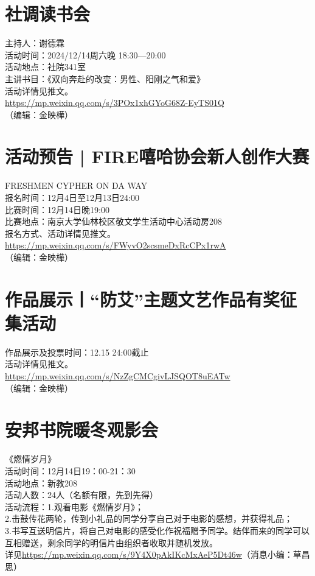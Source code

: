 \documentclass[letterpaper, 12pt]{article}
\begin{document}
\begin{multicols}{2}
\section{社调读书会}
主持人：谢德霖\\
活动时间：2024/12/14周六晚 18:30—20:00\\
活动地点：社院341室\\
主讲书目：《双向奔赴的改变：男性、阳刚之气和爱》\\
活动详情见推文。\\
\url{https://mp.weixin.qq.com/s/3POx1xhGYoG68Z-EyTS01Q}\\
（编辑：金映樺）

\section{活动预告 | FIRE嘻哈协会新人创作大赛}
FRESHMEN CYPHER ON DA WAY\\
报名时间：12月4日至12月13日24:00\\
比赛时间：12月14日晚19:00\\
比赛地点：南京大学仙林校区敬文学生活动中心活动房208\\
报名方式、活动详情见推文。\\
\url{https://mp.weixin.qq.com/s/FWyvO2scsmeDxRcCPx1rwA}\\
（编辑：金映樺）

\section{作品展示丨“防艾”主题文艺作品有奖征集活动}
作品展示及投票时间：12.15 24:00截止\\
活动详情见推文。\\
\url{https://mp.weixin.qq.com/s/NzZgCMCgivLJSQOT8uEATw}\\
（编辑：金映樺）

\section{安邦书院暖冬观影会}
《燃情岁月》\\
活动时间：12月14日19：00-21：30\\
活动地点：新教208\\
活动人数：24人（名额有限，先到先得）\\
活动流程：1.观看电影《燃情岁月》；\\
2.击鼓传花两轮，传到小礼品的同学分享自己对于电影的感想，并获得礼品；\\
3.书写互送明信片，将自己对电影的感受化作祝福赠予同学。结伴而来的同学可以互相赠送，剩余同学的明信片由组织者收取并随机发放。\\
详见\url{https://mp.weixin.qq.com/s/9Y4X0pAkIKcMxAeP5Dt46w}（消息小编：草昌思）

\end{multicols}
\end{document}

